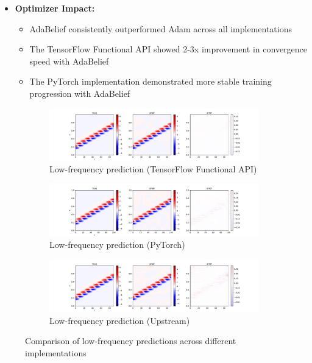 \documentclass[10pt,journal,compsoc,onecolumn]{IEEEtran}
\begin{document}
\begin{itemize}
    \item \textbf{Optimizer Impact:}
    \begin{itemize}
        \item AdaBelief consistently outperformed Adam across all implementations
        \item The TensorFlow Functional API showed 2-3x improvement in convergence speed with AdaBelief
        \item The PyTorch implementation demonstrated more stable training progression with AdaBelief
    \end{itemize}
\end{itemize}

\begin{figure}[htbp]
    \centering
    \begin{subfigure}[b]{0.3\textwidth}
        \includegraphics[width=\textwidth]{../../results/functional/low-frequency-adabelief-20250206-1105-1/vis}
        \caption{Low-frequency prediction (TensorFlow Functional API)}
        \label{fig:low_freq_functional}
    \end{subfigure}
    \begin{subfigure}[b]{0.3\textwidth}
        \includegraphics[width=\textwidth]{../../results/pytorch/low-frequency-adabelief-20250206-1600-1/vis}
        \caption{Low-frequency prediction (PyTorch)}
        \label{fig:low_freq_pytorch}
    \end{subfigure}
    \begin{subfigure}[b]{0.3\textwidth}
        \includegraphics[width=\textwidth]{../../results/upstream/low-frequency-adabelief-20250206-1105-1/vis}
        \caption{Low-frequency prediction (Upstream)}
        \label{fig:low_freq_upstream}
    \end{subfigure}
    \caption{Comparison of low-frequency predictions across different implementations}
    \label{fig:low_freq_comparison}
\end{figure}
\end{document}

